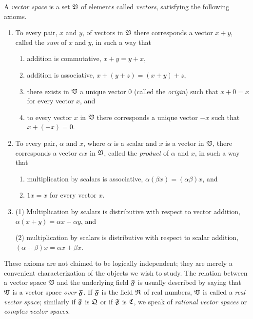 \begin{definition}
    A \emph{vector space} is a set \(  \mathfrak{V}\) of elements called \emph{vectors}, satisfying the following axioms.

    \begin{enumerate}[label=(\Alph*), wide]
        \item To every pair, \(x\) and \(y\), of vectors in \(  \mathfrak{V}\) there corresponds a vector \(x + y\), called the \emph{sum} of \(x\) and \(y\), in such a way that
        \begin{enumerate}[label=(\arabic*), wide]
            \item addition is commutative, \(x + y = y + x\),
            \item addition is associative, \(x + (y + z) = (x + y) + z\),
            \item there exists in \(  \mathfrak{V}\) a unique vector 0 (called the \emph{origin}) such that \(x + 0 = x\) for every vector \(x\), and
            \item to every vector \(x\) in \(  \mathfrak{V}\) there corresponds a unique vector \(-x\) such that \(x + (-x) = 0\).
        \end{enumerate}
        \smallskip
        \item To every pair, \(\alpha\) and \(x\), where \(\alpha\) is a scalar and \(x\) is a vector in \(  \mathfrak{V}\), there corresponds a vector \(\alpha x\) in \(  \mathfrak{V}\), called the \emph{product} of \(\alpha\) and \(x\), in such a way that
        \begin{enumerate}[label=(\arabic*), wide]
            \item multiplication by scalars is associative, \(\alpha(\beta x) = (\alpha \beta)x\), and
            \item \(1x = x\) for every vector \(x\).
        \end{enumerate}
        \smallskip
        \item (1) Multiplication by scalars is distributive with respect to vector addition, \(\alpha(x + y) = \alpha x + \alpha y\), and
        
        (2) multiplication by scalars is distributive with respect to scalar addition, \((\alpha + \beta)x = \alpha x + \beta x\).
    \end{enumerate}
\end{definition}

These axioms are not claimed to be logically independent; they are merely a
convenient characterization of the objects we wish to study. The relation
between a vector space \(  \mathfrak{V}\) and the underlying field \(\mathfrak{F}\) is
usually described by saying that \(  \mathfrak{V}\) is a vector space \emph{over}
\(\mathfrak{F}\). If \(\mathfrak{F}\) is the field \(\mathfrak{R}\) of real numbers, \(  \mathfrak{V}\)
is called a \emph{real vector space}; similarly if \(\mathfrak{F}\) is \(\mathfrak{Q}\)
or if \(\mathfrak{F}\) is \(\mathfrak{C}\), we speak of \emph{rational vector spaces} or
\emph{complex vector spaces}.

